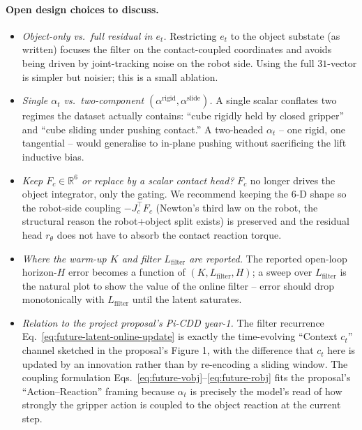 \documentclass[11pt]{article}
\begin{document}
\paragraph{Open design choices to discuss.}
\begin{itemize}
  \item \emph{Object-only vs.\ full residual in $e_t$.} Restricting $e_t$
    to the object substate (as written) focuses the filter on the
    contact-coupled coordinates and avoids being driven by
    joint-tracking noise on the robot side. Using the full $31$-vector
    is simpler but noisier; this is a small ablation.
  \item \emph{Single $\alpha_t$ vs.\ two-component $(\alpha^{\mathrm{rigid}}, \alpha^{\mathrm{slide}})$.}
    A single scalar conflates two regimes the dataset actually contains:
    ``cube rigidly held by closed gripper'' and ``cube sliding under
    pushing contact.''  A two-headed $\alpha_t$ -- one rigid, one tangential --
    would generalise to in-plane pushing without sacrificing the lift
    inductive bias.
  \item \emph{Keep $F_c \in \mathbb{R}^6$ or replace by a scalar
    contact head?} $F_c$ no longer drives the object integrator, only
    the gating. We recommend keeping the 6-D shape so the robot-side
    coupling $-J_c^\top F_c$ (Newton's third law on the robot, the
    structural reason the robot+object split exists) is preserved and
    the residual head $r_\theta$ does not have to absorb the contact
    reaction torque.
  \item \emph{Where the warm-up $K$ and filter $L_{\mathrm{filter}}$
    are reported.} The reported open-loop horizon-$H$ error becomes a
    function of $(K, L_{\mathrm{filter}}, H)$; a sweep over
    $L_{\mathrm{filter}}$ is the natural plot to show the value of the
    online filter -- error should drop monotonically with
    $L_{\mathrm{filter}}$ until the latent saturates.
  \item \emph{Relation to the project proposal's Pi-CDD year-1.} The
    filter recurrence Eq.~\eqref{eq:future-latent-online-update} is
    exactly the time-evolving ``Context $c_t$'' channel sketched in the
    proposal's Figure 1, with the difference that $c_t$ here is updated
    by an innovation rather than by re-encoding a sliding window. The
    coupling formulation Eqs.~\eqref{eq:future-vobj}--\eqref{eq:future-robj}
    fits the proposal's ``Action--Reaction'' framing because $\alpha_t$
    is precisely the model's read of how strongly the gripper action is
    coupled to the object reaction at the current step.
\end{itemize}
\end{document}
